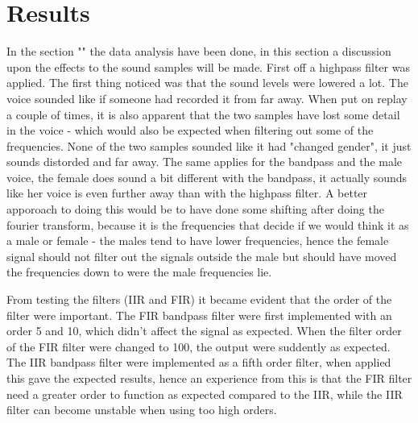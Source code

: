 
\section{Results}
In the section "" the data analysis have been done, in this section a discussion upon the effects to the sound samples will be made. First off a highpass filter was applied. The first thing noticed was that the sound levels were lowered a lot. The voice sounded like if someone had recorded it from far away. When put on replay a couple of times, it is also apparent that the two samples have lost some detail in the voice - which would also be expected when filtering out some of the frequencies. None of the two samples sounded like it had "changed gender", it just sounds distorded and far away. The same applies for the bandpass and the male voice, the female does sound a bit different with the bandpass, it actually sounds like her voice is even further away than with the highpass filter. A better apporoach to doing this would be to have done some shifting after doing the fourier transform, because it is the frequencies that decide if we would think it as a male or female - the males tend to have lower frequencies, hence the female signal should not filter out the signals outside the male but should have moved the frequencies down to were the male frequencies lie. 

From testing the filters (IIR and FIR) it became evident that the order of the filter were important. The FIR bandpass filter were first implemented with an order 5 and 10, which didn't affect the signal as expected. When the filter order of the FIR filter were changed to 100, the output were suddently as expected. The IIR bandpass filter were implemented as a fifth order filter, when applied this gave the expected results, hence an experience from this is that the FIR filter need a greater order to function as expected compared to the IIR, while the IIR filter can become unstable when using too high orders.